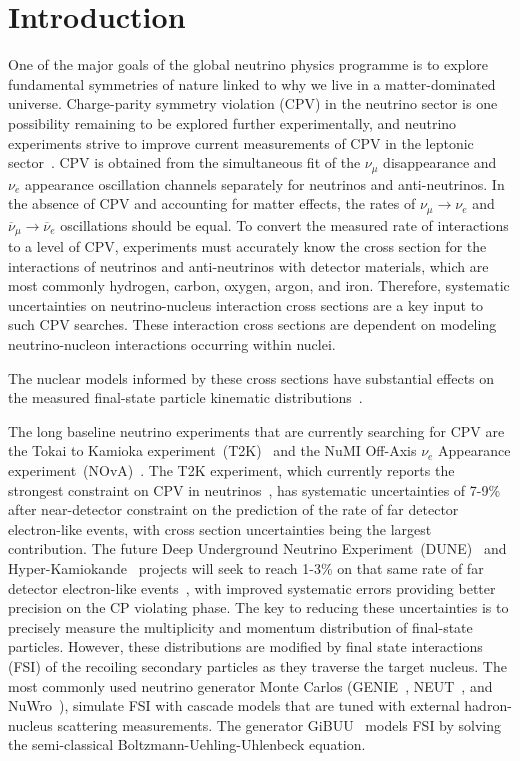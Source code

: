 \section{Introduction}
One of the major goals of the global neutrino physics programme is to explore fundamental symmetries of nature linked to why we live in a matter-dominated universe. 
Charge-parity symmetry violation (CPV) in the neutrino sector is one possibility remaining to be explored further experimentally, and neutrino experiments strive to improve current measurements of CPV in the leptonic sector~\cite{Abe:2019vii}. 
CPV is obtained from the simultaneous fit of the $\nu_{\mu}$ disappearance and $\nu_e$ appearance oscillation channels separately for neutrinos and anti-neutrinos.
In the absence of CPV and accounting for matter effects, the rates of $\nu_{\mu}\!\rightarrow\!\nu_e$ and $\overline{\nu}_{\mu}\!\rightarrow\!\overline{\nu}_e$ oscillations should be equal.
To convert the measured rate of interactions to a level of CPV, experiments must accurately know the cross section for the interactions of neutrinos and anti-neutrinos with detector materials, which are most commonly hydrogen, carbon, oxygen, argon, and iron. 
Therefore, systematic uncertainties on neutrino-nucleus interaction cross sections are a key input to such CPV searches.  
These interaction cross sections are dependent on modeling neutrino-nucleon interactions occurring within nuclei. 

The nuclear models informed by these cross sections have substantial effects on the measured final-state particle kinematic distributions~\cite{Mosel:2016cwa}.

The long baseline neutrino experiments that are currently searching for CPV are the Tokai to Kamioka experiment~(T2K)~\cite{Abe:2019vii} and the NuMI Off-Axis $\nu_{e}$ Appearance experiment~(NOvA)~\cite{Acero:2019ksn}.
The T2K experiment, which currently reports the strongest constraint on CPV in neutrinos~\cite{Abe:2019vii}, has systematic uncertainties of 7-9\% after near-detector constraint on the prediction of the rate of far detector electron-like events, with cross section uncertainties being the largest contribution.
The future Deep Underground Neutrino Experiment~(DUNE)~\cite{abi2020deep} and Hyper-Kamiokande~\cite{abe2011letter} projects will seek to reach 1-3\% on that same rate of far detector electron-like events~\cite{acciarri2016long}, with improved systematic errors providing better precision on the CP violating phase.
The key to reducing these uncertainties is to precisely measure the multiplicity and momentum distribution of final-state particles. 
However, these distributions are modified by final state interactions (FSI) of the recoiling secondary particles as they traverse the target nucleus. 
The most commonly used neutrino generator Monte Carlos (GENIE~\cite{Andreopoulos:2009rq}, NEUT~\cite{Hayato:2009zz}, and NuWro~\cite{GOLAN2012499}), simulate FSI with cascade models that are tuned with external hadron-nucleus scattering measurements. The generator GiBUU~\cite{lalakulich2013neutrino} models FSI by solving the semi-classical Boltzmann-Uehling-Uhlenbeck equation.

